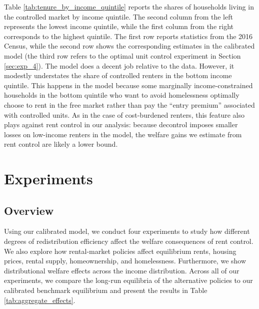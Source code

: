 \documentclass[parskip=full]{article}
\begin{document}
Table \ref{tab:tenure_by_income_quintile} reports the shares of households living in the controlled market by income quintile. The second column from the left represents the lowest income quintile, while the first column from the right corresponds to the highest quintile. The first row reports statistics from the 2016 Census, while the second row shows the corresponding estimates in the calibrated model (the third row refers to the optimal unit control experiment in Section \ref{sec:exp_4}). The model does a decent job relative to the data. However, it modestly understates the share of controlled renters in the bottom income quintile. This happens in the model because some marginally income-constrained households in the bottom quintile who want to avoid homelessness optimally choose to rent in the free market rather than pay the ``entry premium'' associated with controlled units. As in the case of cost-burdened renters, this feature also plays against rent control in our analysis: because decontrol imposes smaller losses on low-income renters in the model, the welfare gains we estimate from rent control are likely a lower bound.

\section{Experiments}\label{section:experiments}

\subsection{Overview}\label{sec:overview_experiments}

Using our calibrated model, we conduct four experiments to study how different degrees of redistribution efficiency affect the welfare consequences of rent control. We also explore how rental-market policies affect equilibrium rents, housing prices, rental supply, homeownership, and homelessness. Furthermore, we show distributional welfare effects across the income distribution. Across all of our experiments, we compare the long-run equilibria of the alternative policies to our calibrated benchmark equilibrium and present the results in Table \ref{tab:aggregate_effects}.
\end{document}
